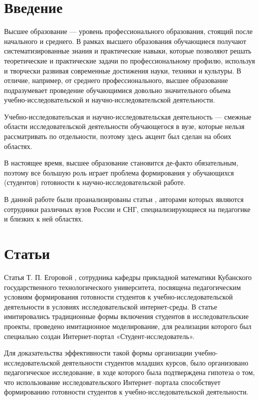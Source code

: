 \documentclass[oneside]{scrartcl}
\begin{document}
\sloppy	
	
\section*{Введение}
Высшее образование --- уровень профессионального образования, стоящий после начального и среднего. В рамках высшего образования
обучающиеся получают систематизированные знания и практические навыки, которые позволяют решать теоретические и практические задачи
по профессиональному профилю, используя и творчески развивая современные достижения науки, техники и культуры. В отличие, например, от среднего профессионального, высшее образование подразумевает проведение обучающимися довольно значительного объема 
учебно-исследовательской и научно-исследовательской деятельности.

Учебно-исследовательская и научно-исследовательская деятельность --- смежные области исследовательской деятельности обучающегося в вузе, которые нельзя рассматривать
по отдельности, поэтому здесь акцент был сделан на обоих областях.
 
В настоящее время, высшее образование становится де-факто обязательным, поэтому все большую роль играет проблема формирования
у обучающихся (студентов) готовности к научно-исследовательской работе.

В данной работе были проанализированы статьи \cite{egorova, bystrenina, prohorova, kalganova, koldina, dolganov}, авторами которых
являются сотрудники различных вузов России и СНГ, специализирующиеся на педагогике и близких к ней областях.

\section*{Статьи}
Статья Т. П. Егоровой \cite{egorova}, сотрудника кафедры прикладной математики Кубанского государственного технологического
университета, посвящена педагогическим условиям формирования готовности студентов к учебно-исследовательской деятельности
в условиях исследовательской интернет-среды. В статье имитировались традиционные формы включения студентов в исследовательские
проекты, проведено имитационное моделирование, для реализации которого был специально создан Интернет-портал 
«Студент-исследователь».

Для доказательства эффективности такой формы организации учебно-исследовательской деятельности студентов младших курсов, было
организовано педагогическое исследование, в ходе которого была подтверждена гипотеза о том, что использование исследовательского
Интернет–портала способствует формированию готовности студентов к учебно-исследовательской деятельности.
\end{document}
